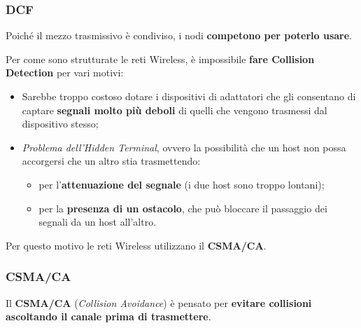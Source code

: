 \documentclass[a4paper]{article}
\begin{document}
		\subsubsection{DCF}
		
			Poiché il mezzo trasmissivo è condiviso, i nodi \textbf{competono per poterlo usare}.
			
			Per come sono strutturate le reti Wireless, è impossibile \textbf{fare Collision Detection} per vari motivi:
			\begin{itemize}
				\item Sarebbe troppo costoso dotare i dispositivi di adattatori che gli consentano di captare \textbf{segnali molto più deboli} di quelli che vengono trasmessi dal dispositivo stesso;
				\item \emph{Problema dell'Hidden Terminal}, ovvero la possibilità che un host non possa accorgersi che un altro stia trasmettendo:
				\begin{itemize}
					\item per l'\textbf{attenuazione del segnale} (i due host sono troppo lontani);
					\item per la \textbf{presenza di un ostacolo}, che può bloccare il passaggio dei segnali da un host all'altro.
				\end{itemize}
			\end{itemize}
			
			Per questo motivo le reti Wireless utilizzano il \textbf{CSMA/CA}.
			
		\subsubsection{CSMA/CA}
			
			Il \textbf{CSMA/CA} (\emph{Collision Avoidance}) è pensato per \textbf{evitare collisioni ascoltando il canale prima di trasmettere}.
			
\end{document}

